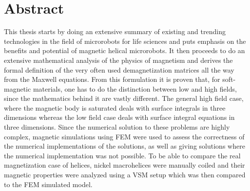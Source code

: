 \section*{Abstract}

This thesis starts by doing an extensive summary of existing and trending technologies in the field of microrobots for life sciences and puts emphasis on the benefits and potential of magnetic helical microrobots. It then proceeds to do an extensive mathematical analysis of the physics of magnetism and derives the formal definition of the very often used demagnetization matrices all the way from the Maxwell equations. From this formulation it is proven that, for soft-magnetic materials, one has to do the distinction between low and high fields, since the mathematics behind it are vastly different. The general high field case, where the magnetic body is saturated deals with surface integrals in three dimensions whereas the low field case deals with surface integral equations in three dimensions. Since the numerical solution to these problems are highly complex, magnetic simulations using FEM were used to assess the correctness of the numerical implementations of the solutions, as well as giving solutions where the numerical implementation was not possible. To be able to compare the real magnetization case of helices, nickel macrohelices were manually coiled and their magnetic properties were analyzed using a VSM setup which was then compared to the FEM simulated model.
